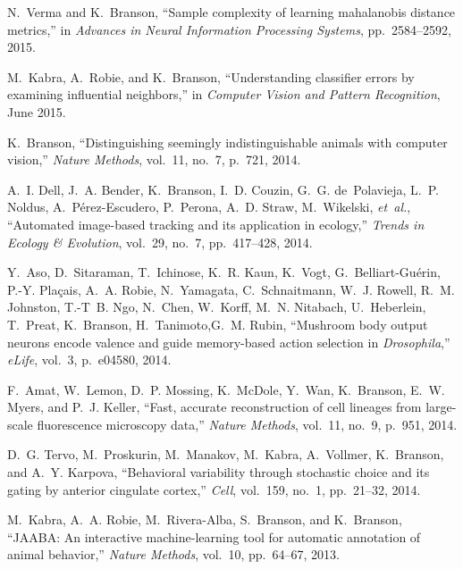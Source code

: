 \begin{cvenum}
\item N.~Verma and K.~Branson, ``Sample complexity of learning mahalanobis distance metrics,'' in {\em Advances in Neural Information Processing Systems}, pp.~2584--2592, 2015.

\item M.~Kabra, A.~Robie, and K.~Branson, ``Understanding classifier errors by
  examining influential neighbors,'' in {\em Computer Vision and Pattern
  Recognition}, June 2015.

\item K.~Branson, ``Distinguishing seemingly indistinguishable animals with computer
  vision,'' {\em Nature Methods}, vol.~11, no.~7, p.~721, 2014.

\item A.~I. Dell, J.~A. Bender, K.~Branson, I.~D. Couzin, G.~G. de~Polavieja, L.~P.
  Noldus, A.~P{\'e}rez-Escudero, P.~Perona, A.~D. Straw, M.~Wikelski, {\em
  et~al.}, ``Automated image-based tracking and its application in ecology,''
  {\em Trends in Ecology \& Evolution}, vol.~29, no.~7, pp.~417--428, 2014.

  \item Y.~Aso, D.~Sitaraman, T.~Ichinose, K.~R. Kaun, K.~Vogt, G.~Belliart-Gu{\'e}rin, P.-Y. Pla{\c{c}}ais, A.~A. Robie, N.~Yamagata, C.~Schnaitmann, W.~J. Rowell, R.~M. Johnston, T.-T~B. Ngo, N.~Chen, W.~Korff, M.~N. Nitabach, U.~Heberlein, T.~Preat, K.~Branson, H.~Tanimoto,G.~M. Rubin,  ``Mushroom body output neurons encode valence and guide memory-based action selection in {\em {{D}}rosophila},'' {\em eLife}, vol.~3, p.~e04580, 2014.

\item F.~Amat, W.~Lemon, D.~P. Mossing, K.~McDole, Y.~Wan, K.~Branson, E.~W. Myers,
  and P.~J. Keller, ``Fast, accurate reconstruction of cell lineages from
  large-scale fluorescence microscopy data,'' {\em Nature Methods}, vol.~11,
  no.~9, p.~951, 2014.

\item D.~G. Tervo, M.~Proskurin, M.~Manakov, M.~Kabra, A.~Vollmer, K.~Branson, and
  A.~Y. Karpova, ``Behavioral variability through stochastic choice and its
  gating by anterior cingulate cortex,'' {\em Cell}, vol.~159, no.~1,
  pp.~21--32, 2014.
  
\item M.~Kabra, A.~A. Robie, M.~Rivera-Alba, S.~Branson, and K.~Branson, ``{{JAABA}}:
  An interactive machine-learning tool for automatic annotation of animal
  behavior,'' {\em Nature Methods}, vol.~10, pp.~64--67, 2013.


\end{cvenum}
